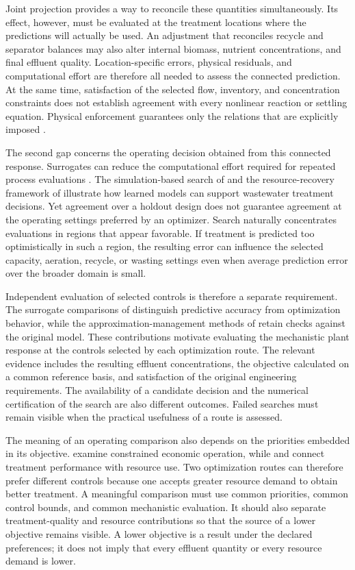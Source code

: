 Joint projection provides a way to reconcile these quantities simultaneously. Its effect, however, must be evaluated at the treatment locations where the predictions will actually be used. An adjustment that reconciles recycle and separator balances may also alter internal biomass, nutrient concentrations, and final effluent quality. Location-specific errors, physical residuals, and computational effort are therefore all needed to assess the connected prediction. At the same time, satisfaction of the selected flow, inventory, and concentration constraints does not establish agreement with every nonlinear reaction or settling equation. Physical enforcement guarantees only the relations that are explicitly imposed \citep{KircherVotsmeier2025,Selerio2026}.

The second gap concerns the operating decision obtained from this connected response. Surrogates can reduce the computational effort required for repeated process evaluations \citep{McBride2019,BhosekarIerapetritou2018}. The simulation-based search of \citet{Fang2011} and the resource-recovery framework of \citet{Durkin2024} illustrate how learned models can support wastewater treatment decisions. Yet agreement over a holdout design does not guarantee agreement at the operating settings preferred by an optimizer. Search naturally concentrates evaluations in regions that appear favorable. If treatment is predicted too optimistically in such a region, the resulting error can influence the selected capacity, aeration, recycle, or wasting settings even when average prediction error over the broader domain is small.

Independent evaluation of selected controls is therefore a separate requirement. The surrogate comparisons of \citet{Pedrozo2025} distinguish predictive accuracy from optimization behavior, while the approximation-management methods of \citet{Hameed2026} retain checks against the original model. These contributions motivate evaluating the mechanistic plant response at the controls selected by each optimization route. The relevant evidence includes the resulting effluent concentrations, the objective calculated on a common reference basis, and satisfaction of the original engineering requirements. The availability of a candidate decision and the numerical certification of the search are also different outcomes. Failed searches must remain visible when the practical usefulness of a route is assessed.

The meaning of an operating comparison also depends on the priorities embedded in its objective. \citet{Araujo2013} examine constrained economic operation, while \citet{PadronPaez2020} and \citet{Aboagye2021} connect treatment performance with resource use. Two optimization routes can therefore prefer different controls because one accepts greater resource demand to obtain better treatment. A meaningful comparison must use common priorities, common control bounds, and common mechanistic evaluation. It should also separate treatment-quality and resource contributions so that the source of a lower objective remains visible. A lower objective is a result under the declared preferences; it does not imply that every effluent quantity or every resource demand is lower.

